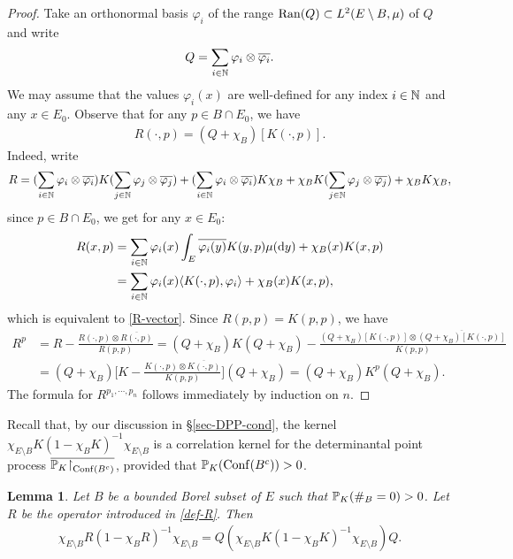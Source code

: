 \documentclass[12pt]{paper}
\newtheorem{lemma}[theorem]{Lemma}
\numberwithin{theorem}{section}
\numberwithin{figure}{section}
\numberwithin{equation}{section}
\begin{document}
\begin{proof}
Take an orthonormal basis $\varphi_i$ of the range $\mathrm{Ran}(Q) \subset L^2(E\setminus B, \mu)$ of $Q$ and write
\[
Q = \sum_{i\in \mathbb{N}} \varphi_i \otimes \overline{\varphi_i}.
\]
We may assume that the values $\varphi_i(x)$ are well-defined for any index $i \in \mathbb{N}$ and any $x\in E_0$.  Observe that for any $p\in B\cap E_0$, we have
\begin{align}\label{R-vector}
R(\cdot, p) =  (Q + \chi_B) [K(\cdot, p)].
\end{align}
Indeed, write
\[
R = (\sum_{i\in \mathbb{N}}\varphi_{i} \otimes \overline{\varphi_i} ) K (\sum_{j\in \mathbb{N}} \varphi_j \otimes \overline{\varphi_j}) + (\sum_{i\in \mathbb{N}}\varphi_{i} \otimes \overline{\varphi_i} ) K \chi_B + \chi_B K (\sum_{j\in \mathbb{N}} \varphi_j \otimes \overline{\varphi_j})  +\chi_B K \chi_B,
\]
since $p\in B\cap E_0$, we get for any $x \in E_0$:
\begin{align*}
R(x, p)  &=   \sum_{i\in \mathbb{N}}\varphi_{i}(x) \int_{E}\overline{\varphi_i(y)}  K(y, p)  \mu(\mathrm{d} y)+\chi_B(x)  K(x, p)
\\
& = \sum_{i\in \mathbb{N}} \varphi_i(x) \langle  K(\cdot, p), \varphi_i \rangle + \chi_B(x)  K(x, p),
\end{align*}
which is equivalent to  \eqref{R-vector}.  Since $R(p, p) =  K(p, p)$, we have
\begin{align*}
R^p & = R  - \frac{R(\cdot, p) \otimes \overline{R(\cdot, p)}}{R(p, p)}  = (Q+\chi_B)K(Q+\chi_B) -    \frac{(Q + \chi_B) [K(\cdot, p)] \otimes \overline{(Q + \chi_B) [K(\cdot, p)] }}{ K(p, p)}
\\
& = (Q+\chi_B) \Big[ K - \frac{K(\cdot, p) \otimes \overline{K(\cdot, p)}}{K(p,p)}\Big]   (Q+\chi_B)  =  (Q+\chi_B)  K^p  (Q+\chi_B).
\end{align*}
The formula for $R^{p_1, \cdots, p_n}$ follows immediately by  induction on $n$.
\end{proof}


Recall that, by our discussion in \S \ref{sec-DPP-cond}, the  kernel
$
\chi_{E\setminus B}K(1-\chi_B K)^{-1}\chi_{E\setminus B}
$
is a correlation kernel for the determinantal point process $\overline{\mathbb{P}_K\mathord{\upharpoonright}_{\mathrm{Conf}(B^c)}}$, provided that $\mathbb{P}_K(\mathrm{Conf}(B^c))>0$.


\begin{lemma}\label{lem-res}
Let $B$ be a bounded Borel subset of $E$ such that $\mathbb{P}_K(\#_B = 0) >0$. Let $R$ be the operator introduced in \eqref{def-R}.  Then
\begin{align}\label{R-K}
\chi_{E\setminus B}R(1-\chi_B R)^{-1}\chi_{E\setminus B}=Q\left(\chi_{E\setminus B}K(1-\chi_B K)^{-1}\chi_{E\setminus B}\right)Q.
\end{align}
\end{lemma}
\end{document}
